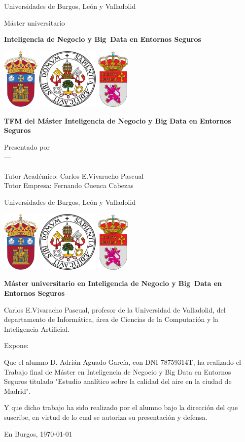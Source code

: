 \documentclass[a4paper,11pt,oneside]{memoir}
\title{\titulo}
\author{\nombre}
\date{\today}
\makeatletter
\def\maketitle{
  \null
  \thispagestyle{empty}
\begin{center}%
	{\noindent\Huge Universidades de Burgos, León y Valladolid}\vspace{.2cm}%
	
	{\noindent\Large Máster universitario}\vspace{.5cm}%
	
	{\noindent\Huge \textbf{Inteligencia de Negocio y Big~Data en Entornos Seguros}}\vspace{.5cm}%
\end{center}%

\begin{center}%
	\includegraphics[height=3cm]{img/escudoUBU} \hspace{1cm}
	\includegraphics[height=3cm]{img/escudoUVA} \hspace{1cm}
	\includegraphics[height=3cm]{img/escudoULE} \vspace{1cm}%
\end{center}%

  \vfill
  \colorbox{cpardoBox}{%
    \begin{minipage}{.9\textwidth}
      \vspace{.5cm}\Large
      \begin{center}
      \textbf{TFM del Máster Inteligencia de Negocio y Big Data en Entornos Seguros}\vspace{.6cm}\\
      \textbf{\LARGE\@title{}}
      \end{center}
      \vspace{.2cm}
    \end{minipage}

  }%
  \hfill
  \vfill
  \begin{center}%
  {%
    \noindent\LARGE
    Presentado por \@author{}\\ 
     ---\\ \@date{}\\
    Tutor Académico:  \tutorA \\
    Tutor Empresa:  \tutorE \\
  }%
  \end{center}%
  \null
  \cleardoublepage
  }
\newcommand{\nombre}{Adrián Aguado García} %
\newcommand{\tutorA}{Carlos E.Vivaracho Pascual} %
\newcommand{\tutorE}{Fernando Cuenca Cabezas} %
\newcommand{\titulo}{Estudio analítico sobre la calidad del aire en la ciudad de Madrid} %
\makeatother
\begin{document}
\maketitle

\newpage\null\thispagestyle{empty}
\newpage\null\thispagestyle{empty}

\thispagestyle{empty}

\noindent
\begin{center}%
	{\noindent\Huge Universidades de Burgos, León y Valladolid}\vspace{.5cm}%
	
\begin{center}%
	\includegraphics[height=3cm]{img/escudoUBU} \hspace{1cm}
	\includegraphics[height=3cm]{img/escudoUVA} \hspace{1cm}
	\includegraphics[height=3cm]{img/escudoULE} \vspace{1cm}%
\end{center}%

	{\noindent\Large \textbf{Máster universitario en Inteligencia de Negocio y Big~Data en Entornos Seguros}}\vspace{.5cm}%
\end{center}%



\begin{center} \tutorA, profesor de la Universidad de Valladolid, del departamento de Informática, área de Ciencias de la Computación y la Inteligencia Artificial.

\noindent Expone:

\noindent Que el alumno D. \nombre, con DNI 78759314T, ha realizado el Trabajo final de Máster en Inteligencia de Negocio y Big Data en Entornos Seguros 
          titulado "\titulo". 

\noindent Y que dicho trabajo ha sido realizado por el alumno bajo la dirección del que suscribe, en virtud de lo cual se autoriza su presentación y defensa.
\end{center}%
\begin{center} %
En Burgos, {\large \today}
\end{center}
\end{document}
